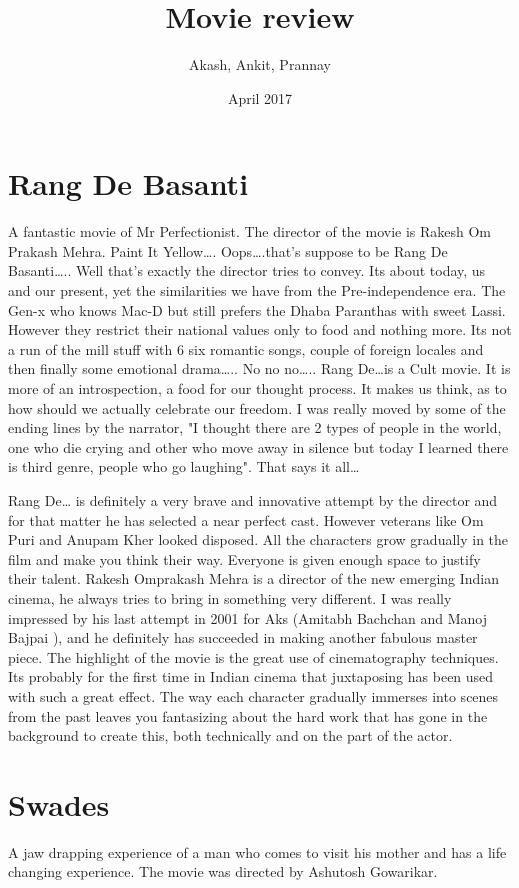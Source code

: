 \documentclass{article}
\title{Movie review}
\author{Akash, Ankit, Prannay}
\date{April 2017}
\begin{document}
\maketitle

\section*{Rang De Basanti}
A fantastic movie of Mr Perfectionist.
The director of the movie is Rakesh Om Prakash Mehra.
Paint It Yellow…. Oops….that's suppose to be Rang De Basanti….. Well that's exactly the director tries to convey. Its about today, us and our present, yet the similarities we have from the Pre-independence era. The Gen-x who knows Mac-D but still prefers the Dhaba Paranthas with sweet Lassi. However they restrict their national values only to food and nothing more. Its not a run of the mill stuff with 6 six romantic songs, couple of foreign locales and then finally some emotional drama….. No no no….. Rang De…is a Cult movie. It is more of an introspection, a food for our thought process. It makes us think, as to how should we actually celebrate our freedom. I was really moved by some of the ending lines by the narrator, "I thought there are 2 types of people in the world, one who die crying and other who move away in silence but today I learned there is third genre, people who go laughing". That says it all… 

Rang De… is definitely a very brave and innovative attempt by the director and for that matter he has selected a near perfect cast. However veterans like Om Puri and Anupam Kher looked disposed. All the characters grow gradually in the film and make you think their way. Everyone is given enough space to justify their talent. Rakesh Omprakash Mehra is a director of the new emerging Indian cinema, he always tries to bring in something very different. I was really impressed by his last attempt in 2001 for Aks (Amitabh Bachchan and Manoj Bajpai ), and he definitely has succeeded in making another fabulous master piece. The highlight of the movie is the great use of cinematography techniques. Its probably for the first time in Indian cinema that juxtaposing has been used with such a great effect. The way each character gradually immerses into scenes from the past leaves you fantasizing about the hard work that has gone in the background to create this, both technically and on the part of the actor.


\section*{Swades}
A jaw drapping experience of a man who comes to visit his mother and has a life changing experience.
The movie was directed by Ashutosh Gowarikar.
\end{document}
